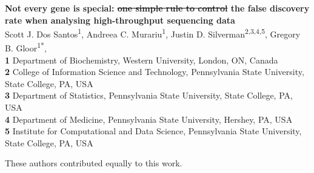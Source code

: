 \documentclass[10pt,letterpaper]{article}
\providecommand{\DIFaddtex}[1]{{\protect\color{blue}\uwave{#1}}} %
\providecommand{\DIFdeltex}[1]{{\protect\color{red}\sout{#1}}}                      %
\providecommand{\DIFaddbegin}{} %
\providecommand{\DIFaddend}{} %
\providecommand{\DIFdelbegin}{} %
\providecommand{\DIFdelend}{} %
\providecommand{\DIFadd}[1]{\texorpdfstring{\DIFaddtex{#1}}{#1}} %
\providecommand{\DIFdel}[1]{\texorpdfstring{\DIFdeltex{#1}}{}} %
\newcommand{\DIFscaledelfig}{0.5}
\newlength{\DIFdelgraphicswidth} %
\newlength{\DIFdelgraphicsheight} %
\newcommand{\DIFaddincludegraphics}[2][]{{\color{blue}\fbox{\DIFOincludegraphics[#1]{#2}}}} %
\newcommand{\DIFdelincludegraphics}[2][]{%
\sbox{\DIFdelgraphicsbox}{\DIFOincludegraphics[#1]{#2}}%
\settoboxwidth{\DIFdelgraphicswidth}{\DIFdelgraphicsbox} %
\settoboxtotalheight{\DIFdelgraphicsheight}{\DIFdelgraphicsbox} %
\scalebox{\DIFscaledelfig}{%
\parbox[b]{\DIFdelgraphicswidth}{\usebox{\DIFdelgraphicsbox}\\[-\baselineskip] \rule{\DIFdelgraphicswidth}{0em}}\llap{\resizebox{\DIFdelgraphicswidth}{\DIFdelgraphicsheight}{%
\setlength{\unitlength}{\DIFdelgraphicswidth}%
\begin{picture}(1,1)%
\thicklines\linethickness{2pt} %
{\color[rgb]{1,0,0}\put(0,0){\framebox(1,1){}}}%
{\color[rgb]{1,0,0}\put(0,0){\line( 1,1){1}}}%
{\color[rgb]{1,0,0}\put(0,1){\line(1,-1){1}}}%
\end{picture}%
}\hspace*{3pt}}} %
} %
\DeclareRobustCommand{\DIFaddbegin}{\DIFOaddbegin \let\includegraphics\DIFaddincludegraphics} %
\DeclareRobustCommand{\DIFaddend}{\DIFOaddend \let\includegraphics\DIFOincludegraphics} %
\DeclareRobustCommand{\DIFdelbegin}{\DIFOdelbegin \let\includegraphics\DIFdelincludegraphics} %
\DeclareRobustCommand{\DIFdelend}{\DIFOaddend \let\includegraphics\DIFOincludegraphics} %
\begin{document}
\vspace*{0.2in}

\begin{flushleft}
{\Large
\textbf{Not every gene is special: \DIFdelbegin \DIFdel{one simple rule to control }\DIFdelend \DIFaddbegin \DIFadd{controlling }\DIFaddend the false discovery rate when analysing high-throughput sequencing data} %
}
\newline
\\
Scott J. Dos Santos\textsuperscript{1\Yinyang},
Andreea C. Murariu\textsuperscript{1\Yinyang},
Justin D. Silverman\textsuperscript{2,3,4,5},
Gregory B. Gloor\textsuperscript{1*},
\\
\bigskip
\textbf{1} Department of Biochemistry, Western University, London, ON, Canada
\\
\textbf{2} College of Information Science and Technology, Pennsylvania State University, State College, PA, USA
\\
\textbf{3} Department of Statistics, Pennsylvania State University, State College, PA, USA
\\
\textbf{4} Department of Medicine, Pennsylvania State University, Hershey, PA, USA
\\
\textbf{5} Institute for Computational and Data Science, Pennsylvania State University, State College, PA, USA
\\
\bigskip

% 
%
\Yinyang These authors contributed equally to this work.


\end{flushleft}
\end{document}
